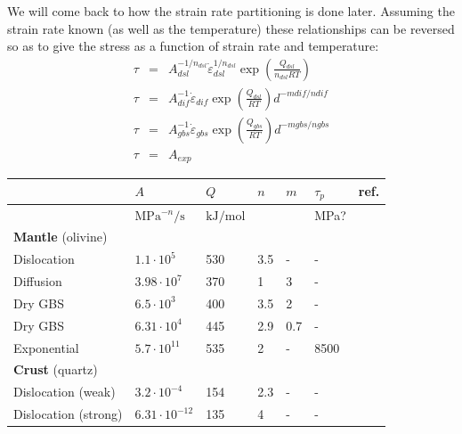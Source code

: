 We will come back to how the strain rate partitioning is done later. 
Assuming the strain rate known (as well as the temperature) these relationships can 
be reversed so as to give the stress as a function of strain rate and temperature:
\begin{eqnarray}
\tau &=& A_{dsl}^{-1/n_{dsl}} \dot\varepsilon_{dsl}^{1/n_{dsl}}  \exp \left(\frac{Q_{dsl}}{n_{dsl} RT} \right)  \\
\tau &=& A_{dif}^{-1}         \dot\varepsilon_{dif}              \exp \left(\frac{Q_{dsl}}{        RT} \right) d^{-mdif/ndif} \\
\tau &=& A_{gbs}^{-1}         \dot\varepsilon_{gbs}              \exp \left(\frac{Q_{gbs}}{        RT} \right) d^{-mgbs/ngbs} \\
\tau &=& A_{exp}
\end{eqnarray}


\begin{center}
\begin{tabular}{lllllll}
\hline
& $A$ & $Q$ & $n$ & $m$ & $\tau_p$ & ref. \\
\hline\hline
 & $\si{\mega\pascal^{-n}\per\second}$ & $\si{\kilo\joule\per\mole}$ &&& \si{\mega\pascal}?\\
\textbf{Mantle} (olivine)  &  \\ 
Dislocation       & $1.1\cdot10^5$    &530& 3.5 & -  &-   &\cite{hiko03}\\
Diffusion         & $3.98\cdot 10^7$  &370& 1   & 3  &-   &\\
Dry GBS           & $6.5\cdot10^3$    &400& 3.5 & 2  &-   &\\
Dry GBS           & $6.31\cdot10^4$   &445& 2.9 & 0.7&-   &\cite{hazk11}\\
Exponential       & $5.7\cdot10^{11}$ &535& 2   & -  &8500&\cite{goet78}\\
\hline
\textbf{Crust} (quartz) &\\
Dislocation (weak)   &  $3.2\cdot10^{-4}$    & 154 & 2.3&- & - & \cite{kikr87}\\
Dislocation (strong) &  $6.31\cdot 10^{-12}$ & 135 & 4&- & - & \cite{hitd01}\\
\hline
\end{tabular}
\end{center}

